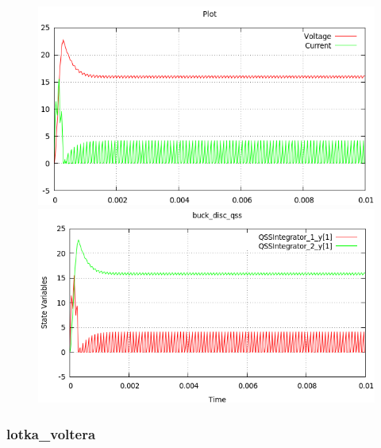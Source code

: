 \documentclass[a4paper,	11pt]{report}
\begin{document}
\begin{figure}[H]
\centering
\begin{minipage}{0.5\textwidth}
\centering
 \includegraphics[width=\linewidth]{buck_disk-pd}
\end{minipage}\hfill
\begin{minipage}{0.5\textwidth}
\centering
 \includegraphics[width=\linewidth]{buck_disk-qss}
\end{minipage}
\end{figure}

\subsubsection{lotka\_voltera}
\end{document}
